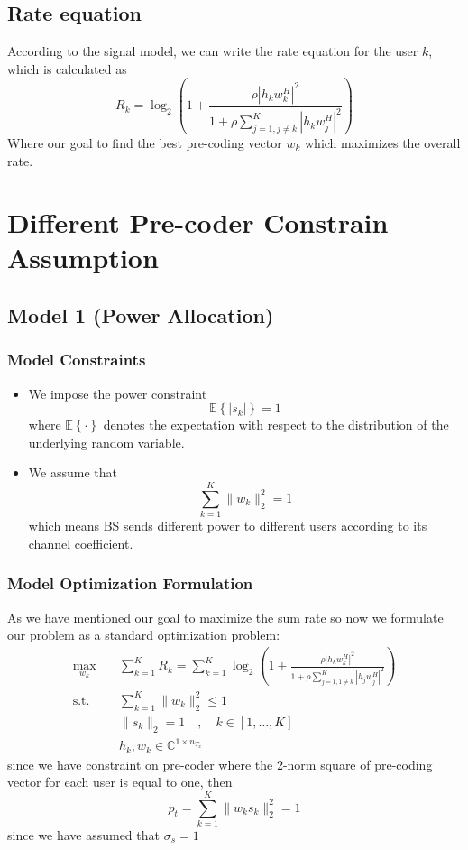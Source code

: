 \subsection{Rate equation}
According to the signal model, we can write the rate equation for the user $k$, which is calculated as
\begin{equation}
    R_k=\log_2\left(1+\frac{{\rho\left|h_k w_k^H\right|}^2}{1+\rho \sum_{j=1,j\neq k}^{K}{\left|h_k w_j^H\right|^2}}\right)
\end{equation}
Where our goal to find the best pre-coding vector $w_k$ which maximizes the overall rate.

\section{Different Pre-coder Constrain Assumption}
\subsection{Model 1 (Power Allocation)}
\subsubsection{Model Constraints}
\begin{itemize}
    \item We impose the power constraint \[\mathbb{E} \left\{ |s_k| \right\} = 1\] where $\mathbb{E}\left\{\cdot\right\}$ denotes the expectation with respect to the distribution of the underlying random variable.
    \item We assume that \[ \sum_{k=1}^{K}\|w_k\|^2_2 = 1\] which means BS sends different power to different users according to its channel coefficient.
\end{itemize}
\subsubsection{Model Optimization Formulation}
As we have mentioned our goal to maximize the sum rate so now we formulate our problem as a standard optimization problem:
\begin{equation}
    \label{eq:multi-user opt pa}
    \begin{aligned}
        \max_{w_k} \quad & \sum_{k=1}^{K} R_k = \sum_{k=1}^{K} \log_2 \left( 1 + \frac{\rho | h_k w_k^H |^2}{1 + \rho \sum_{j=1, 1\neq k}^{K}| h_j w_j^H |^2} \right) \\
        \text{s.t.} \quad &  \sum_{k=1}^{K}\|w_k\|^2_2 \leq 1 \\
        & \|s_k\|_2 =1 \quad , \quad k \in [1, \ldots , K] \\
        & h_k, w_k \in \mathbb{C}^{1 \times n_{T_x}}
    \end{aligned}
\end{equation}
since we have constraint on pre-coder where the 2-norm square of pre-coding vector for each user is equal to one, then \[ p_t = \sum_{k=1}^{K}\|w_k s_k\|^2_2 = 1 \] since we have assumed that $\sigma_s =1$
